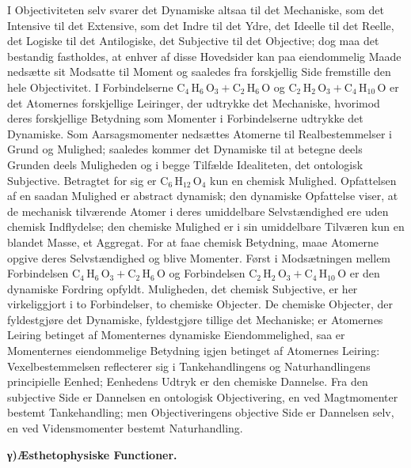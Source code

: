\documentclass[12pt]{book}
\newcommand{\opage}[1]{\marginnote{\footnotesize\textit{[#1]}}}
\begin{document}
I Objectiviteten selv svarer det Dynamiske altsaa til det Mechaniske, som det Intensive til
det Extensive, som det Indre til det Ydre, det Ideelle til det Reelle, det Logiske til det
Antilogiske, det Subjective til det Objective; dog maa det bestandig fastholdes, at enhver
af disse Hovedsider kan paa eiendommelig Maade nedsætte sit Modsatte til Moment og saaledes
fra forskjellig Side fremstille den hele Objectivitet. I Forbindelserne
$\mathrm{C}_{4}\,\mathrm{H}_{6}\,\mathrm{O}_{3} + \mathrm{C}_{2}\,\mathrm{H}_{6}\,\mathrm{O}$
og $\mathrm{C}_{2}\,\mathrm{H}_{2}\,\mathrm{O}_{3} + \mathrm{C}_{4}\,\mathrm{H}_{10}\,\mathrm{O}$
er det Atomernes forskjellige Leiringer, der udtrykke det Mechaniske, hvorimod deres
forskjellige Betydning som Momenter i Forbindelserne udtrykke det Dynamiske. Som
Aarsagsmomenter nedsættes Atomerne til Realbestemmelser i Grund og Mulighed; saaledes kommer
det Dynamiske til at betegne deels Grunden deels Muligheden og i begge Tilfælde Idealiteten,
det ontologisk Subjective. Betragtet for
\opage{369} sig er $\mathrm{C}_{6}\,\mathrm{H}_{12}\,\mathrm{O}_{4}$ kun en chemisk Mulighed. Opfattelsen
af en saadan Mulighed er abstract dynamisk; den dynamiske Opfattelse viser, at de mechanisk
tilværende Atomer i deres umiddelbare Selvstændighed ere uden chemisk Indflydelse; den
chemiske Mulighed er i sin umiddelbare Tilværen kun en blandet Masse, et Aggregat. For at
faae chemisk Betydning, maae Atomerne opgive deres Selvstændighed og blive Momenter. Først
i Modsætningen mellem Forbindelsen $\mathrm{C}_{4}\,\mathrm{H}_{6}\,\mathrm{O}_{3} +
\mathrm{C}_{2}\,\mathrm{H}_{6}\,\mathrm{O}$ og Forbindelsen
$\mathrm{C}_{2}\,\mathrm{H}_{2}\,\mathrm{O}_{3} + \mathrm{C}_{4}\,\mathrm{H}_{10}\,\mathrm{O}$
er den dynamiske Fordring opfyldt. Muligheden, det chemisk Subjective, er her virkeliggjort
i to Forbindelser, to chemiske Objecter. De chemiske Objecter, der fyldestgjøre det
Dynamiske, fyldestgjøre tillige det Mechaniske; er Atomernes Leiring betinget af Momenternes
dynamiske Eiendommelighed, saa er Momenternes eiendommelige Betydning igjen betinget af
Atomernes Leiring: Vexelbestemmelsen reflecterer sig i Tankehandlingens og Naturhandlingens
principielle Eenhed; Eenhedens Udtryk er den chemiske Dannelse. Fra den subjective Side er
Dannelsen en ontologisk Objectivering, en ved Magtmomenter bestemt Tankehandling; men
Objectiveringens objective Side er Dannelsen selv, en ved Vidensmomenter bestemt
Naturhandling.

\begin{center}{\bfseries γ)\quad Æsthetophysiske Functioner.}\end{center}
\end{document}
